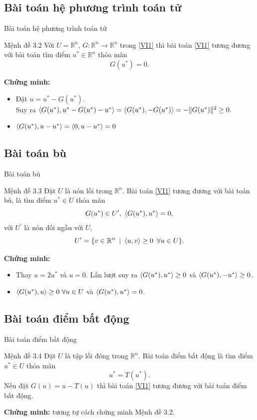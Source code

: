 \documentclass[aspectratio=169]{beamer}
\DeclarePairedDelimiter{\pro}{\langle}{\rangle}
\DeclarePairedDelimiter{\norm}{\lVert}{\rVert}
\theoremstyle{plain}
\theoremstyle{definition}
\theoremstyle{remark}
\begin{document}
\subsection{Bài toán hệ phương trình toán tử}
\begin{frame}{Bài toán hệ phương trình toán tử}\pause
\begin{block}{Mệnh đề 3.2}
    Với $U=\mathbb{R}^n$, $G:\mathbb R^n \to \mathbb R^n$ trong \eqref{VI1} thì bài toán \eqref{VI1} tương đương với bài toán tìm điểm $u^*\in\mathbb{R}^n$ thỏa mãn
    $$
    G(u^*)=0.
    $$
\end{block}
\textbf{Chứng minh:} 
\begin{itemize}
    \item Đặt $u=u^*-G(u^*).$\\ Suy ra $\pro{G(u^*),u^*-G(u^*)-u^*}=\pro{G(u^*),-G(u^*)}=-\norm{G(u^*)}^2\geq0.$
    \item $\pro{G(u^*),u-u^*} = \pro{0,u-u^*}=0$
\end{itemize}
\end{frame}

\subsection{Bài toán bù}
\begin{frame}{Bài toán bù}\pause
\begin{block}{Mệnh đề 3.3}
    Đặt $U$ là nón lồi trong $\mathbb{R}^n$. Bài toán \eqref{VI1} tương đương với bài toán bù, là tìm điểm $u^*\in U$ thỏa mãn 
    \begin{equation*}
        G(u^*)\in U^\prime,\ \pro{G(u^*),u^*}=0,\label{CP}
    \end{equation*}
    với $U^\prime$ là nón đối ngẫu với $U$, 
    $$
    U^\prime = \{v\in\mathbb{R}^n\enskip|\enskip\pro{u,v}\geq0\enskip\forall u\in U\}.
    $$
\end{block}
\textbf{Chứng minh:} 
\begin{itemize}
    \item Thay $u=2u^*$ và $u=0$. Lần lượt suy ra $\pro{G(u^*),u^*}\geq0$ và $\pro{G(u^*),-u^*}\geq0$.
    \item $\pro{G(u^*),u}\geq 0\ \forall u\in U$ và $\pro{G(u^*),u^*}=0$.
\end{itemize}
\end{frame}
\subsection{Bài toán điểm bất động}
\begin{frame}{Bài toán điểm bất động}\pause
\begin{block}{Mệnh đề 3.4}
    Đặt $U$ là tập lồi đóng trong $\mathbb{R}^n$. Bài toán điểm bất động là tìm điểm $u^*\in U$ thỏa mãn 
    \begin{equation*}
        u^*=T(u^*).
    \end{equation*}
    Nếu đặt $G(u)=u-T(u)$ thì bài toán \eqref{VI1} tương đương với bài toán điểm bất động.
\end{block}
\textbf{Chứng minh:} tương tự cách chứng minh Mệnh đề 3.2.
\end{frame}
\end{document}
